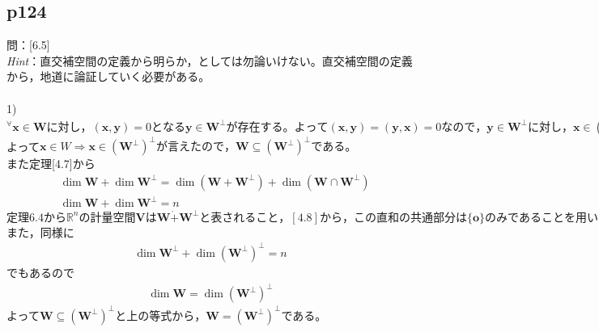 \documentclass[dvipdfmx,uplatex,11pt]{jsarticle}
\begin{document}
\subsection{p124}
\noindent
問：[6.5]\\
\textsl{Hint}：直交補空間の定義から明らか，としては勿論いけない。直交補空間の定義から，地道に論証していく必要がある。\\ 
\dotfill \\
1)$^{\forall}\bm{x} \in \bm{W}に対し，(\bm{x},\bm{y})=0となる\bm{y} \in \bm{W}^{\perp}が存在する。よって(\bm{x},\bm{y})=(\bm{y},\bm{x})=0なので，\bm{y} \in \bm{W}^{\perp}に対し，\bm{x} \in (\bm{W}^{\perp})^{\perp}である。$\\
よって$\bm{x} \in W \Longrightarrow \bm{x} \in  (\bm{W}^{\perp})^{\perp}が言えたので，\bm{W} \subseteq  (\bm{W}^{\perp})^{\perp}である。$\\
また定理[4.7]から
\begin{eqnarray*}
& \dim \bm{W} +\dim \bm{W}^{\perp} =\dim (\bm{W} +\bm{W}^{\perp} )+\dim (\bm{W} \cap \bm{W}^{\perp} ) \\
& \dim \bm{W} +\dim \bm{W}^{\perp} =n
\end{eqnarray*}
$定理6.4から\mathbb{R}^nの計量空間\bm{V}は\bm{W}\dot{+}\bm{W}^{\perp}と表されること，[4.8]から，この直和の共通部分は\{ \bm{o} \}のみであることを用いた。$\\
また，同様に
\begin{eqnarray*}
\dim \bm{W}^{\perp} +\dim (\bm{W}^{\perp})^{\perp} =n
\end{eqnarray*}
でもあるので
\begin{eqnarray*}
\dim \bm{W} =\dim (\bm{W}^{\perp})^{\perp}
\end{eqnarray*}
よって$\bm{W} \subseteq  (\bm{W}^{\perp})^{\perp}と上の等式から，\bm{W} =  (\bm{W}^{\perp})^{\perp}$である。
%
%
%
\newpage
%
%
%
\end{document}
